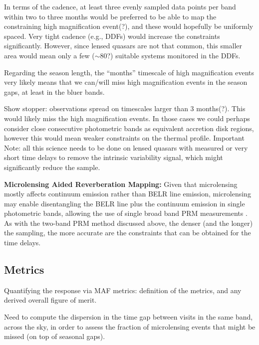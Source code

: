 In terms of the cadence, at least three evenly sampled data points per
band within two to three months would be preferred to be able to map
the constraining high magnification event(?), and these would
hopefully be uniformly spaced. Very tight cadence (e.g., DDFs) would
increase the constraints significantly. However, since lensed quasars
are not that common, this smaller area would mean only a few
($\sim80$?) suitable systems monitored in the DDFs.

Regarding the season length, the ``months'' timescale of high
magnification events very likely means that we can/will miss high
magnification events in the season gaps, at least in the bluer bands.

Show stopper: observations spread on timescales larger than 3 months(?).
This would likely miss the high magnification events. In those cases
we could perhaps consider close consecutive photometric bands as
equivalent accretion disk regions, however this would mean weaker
constraints on the thermal profile.
%
Important Note: all this science needs to be done on lensed quasars
with measured or very short time delays to remove the intrinsic
variability signal, which might significantly reduce the sample.

{\bf Microlensing Aided Reverberation Mapping:} Given that
microlensing mostly affects continuum emission rather than BELR line
emission, microlensing may enable disentangling the BELR line plus the
continuum emission in single photometric bands, allowing the use of
single broad band PRM measurements \citep{SluseandTewes2014}. As with
the two-band PRM method discussed above, the denser (and the longer)
the sampling, the more accurate are the constraints that can be
obtained for the time delays.


\subsection{Metrics}
\label{sec:\secname:metrics}

Quantifying the response via MAF metrics: definition of the metrics,
and any derived overall figure of merit.

Need to compute the dispersion in the time gap
between visits in the same band, across the sky, in order to assess
the fraction of microlensing events that might be missed (on top of
seasonal gaps).


